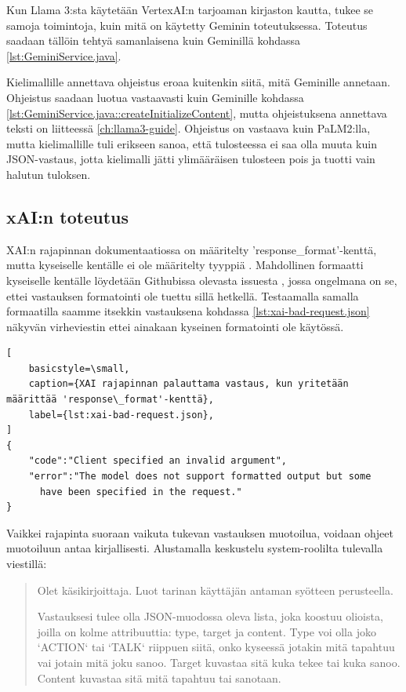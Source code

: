 Kun Llama 3:sta käytetään VertexAI:n tarjoaman kirjaston kautta, tukee se
samoja toimintoja, kuin mitä on käytetty Geminin toteutuksessa. Toteutus
saadaan tällöin tehtyä samanlaisena kuin Geminillä kohdassa
\ref{lst:GeminiService.java}.

Kielimallille annettava ohjeistus eroaa kuitenkin siitä, mitä Geminille
annetaan. Ohjeistus saadaan luotua vastaavasti kuin Geminille kohdassa
\ref{lst:GeminiService.java::createInitializeContent}, mutta ohjeistuksena
annettava teksti on liitteessä \ref{ch:llama3-guide}. Ohjeistus on vastaava
kuin PaLM2:lla, mutta kielimallille tuli erikseen sanoa, että tulosteessa ei
saa olla muuta kuin JSON-vastaus, jotta kielimalli jätti ylimääräisen
tulosteen pois ja tuotti vain halutun tuloksen.

\subsection{xAI:n toteutus}

XAI:n rajapinnan dokumentaatiossa on määritelty 'response\_format'-kenttä, mutta
kyseiselle kentälle ei ole määritelty tyyppiä \parencite{xAIDocsEndpoints}.
Mahdollinen formaatti kyseiselle kentälle löydetään Githubissa olevasta
issuesta \parencite{githubBerriAIlitellmIssues6610}, jossa ongelmana on se,
ettei vastauksen formatointi ole tuettu sillä hetkellä. Testaamalla samalla
formaatilla saamme itsekkin vastauksena kohdassa \ref{lst:xai-bad-request.json}
näkyvän virheviestin ettei ainakaan kyseinen formatointi ole käytössä.

\begin{lstlisting}[
    basicstyle=\small,
    caption={XAI rajapinnan palauttama vastaus, kun yritetään määrittää 'response\_format'-kenttä},
    label={lst:xai-bad-request.json},
]
{
    "code":"Client specified an invalid argument",
    "error":"The model does not support formatted output but some
      have been specified in the request."
}
\end{lstlisting}

Vaikkei rajapinta suoraan vaikuta tukevan vastauksen muotoilua, voidaan ohjeet
muotoiluun antaa kirjallisesti. Alustamalla keskustelu system-roolilta
tulevalla viestillä:

\begin{quotation}
    \noindent Olet käsikirjoittaja. Luot tarinan käyttäjän antaman syötteen
    perusteella.

    \noindent Vastauksesi tulee olla JSON-muodossa oleva lista, joka koostuu
    olioista, joilla on kolme attribuuttia: type, target ja content. Type voi
    olla joko `ACTION` tai `TALK` riippuen siitä, onko kyseessä jotakin mitä
    tapahtuu vai jotain mitä joku sanoo. Target kuvastaa sitä kuka tekee tai
    kuka sanoo. Content kuvastaa sitä mitä tapahtuu tai sanotaan.
\end{quotation}

